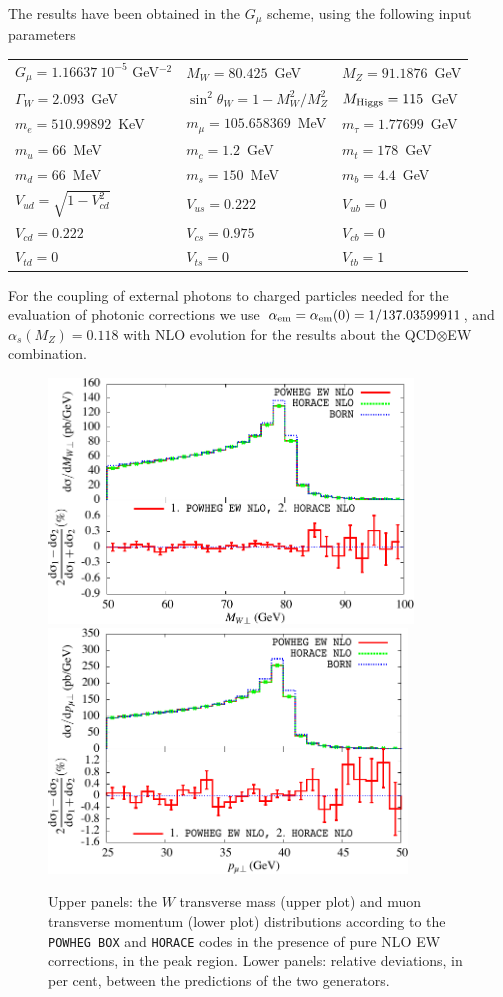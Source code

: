 \documentclass[11pt,a4paper]{article}
\newcommand\POWHEGBOX{\texttt{POWHEG BOX}}
\newcommand\aem{\alpha_{\rm em}}
\begin{document}
The results have been obtained in the $G_\mu$ scheme, using the following input parameters
\begin{center}
\begin{tabular}{lll}
$G_{\mu} = 1.16637~10^{-5}$ GeV$^{-2}$ & 
$M_W = 80.425$~GeV&
$M_Z = 91.1876$~GeV \\
$\Gamma_W = 2.093$~GeV & 
$\sin^2\theta_W = 1 - M_W^2/M_Z^2$&
$M_{\rm Higgs} = 115$~GeV\\
$m_e=510.99892$~KeV &
$m_{\mu}=105.658369$~MeV &
$m_{\tau}=1.77699$~GeV \\
$m_u = 66$~MeV &
$m_c = 1.2$~GeV &
$m_t = 178$~GeV \\
$m_d = 66$~MeV &
$m_s = 150$~MeV &
$m_b = 4.4$~GeV \\
$V_{ud}=\sqrt{1 - V_{cd}^2}$ &
$V_{us}=0.222$ &
$V_{ub}=0$ \\
$V_{cd}=0.222$ &
$V_{cs}= 0.975$ &
$V_{cb}=0$ \\
$V_{td}=0$ &
$V_{ts}=0$ &
$V_{tb}=1$ \\
\end{tabular}
\end{center}
For the coupling of external photons to charged particles needed for the evaluation of photonic corrections we use 
$\aem = \aem (0) =1/137.03599911$, and $\alpha_s (M_Z) = 0.118$ with NLO evolution
for the results about the QCD$\otimes$EW combination.


\begin{figure}[hbtp]
\begin{center}
\includegraphics[height=6.5cm]{Fig1a}
\includegraphics[height=6.5cm]{Fig1b}
\caption{Upper panels: the $W$ transverse mass (upper plot) and muon transverse momentum (lower plot) 
distributions according to the 
\POWHEGBOX{} and \texttt{HORACE} codes in the presence of 
pure NLO EW corrections, in the peak region. Lower panels: relative deviations, in per cent, between the 
predictions of the two generators.}
\label{ewpeak}
\end{center}
\end{figure}
\end{document}
